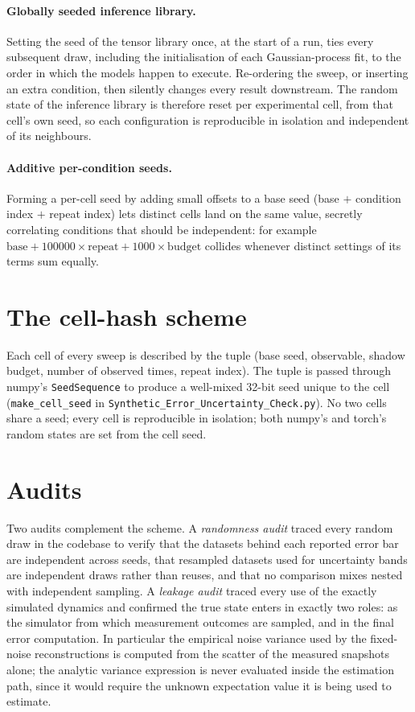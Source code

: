\documentclass[11pt]{article}
\begin{document}
\paragraph{Globally seeded inference library.} Setting the seed of the tensor library once, at the start
of a run, ties every subsequent draw, including the initialisation of each Gaussian-process fit, to the
order in which the models happen to execute. Re-ordering the sweep, or inserting an extra condition,
then silently changes every result downstream. The random state of the inference library is therefore
reset per experimental cell, from that cell's own seed, so each configuration is reproducible in
isolation and independent of its neighbours.

\paragraph{Additive per-condition seeds.} Forming a per-cell seed by adding small offsets to a base seed
(base $+$ condition index $+$ repeat index) lets distinct cells land on the same value, secretly
correlating conditions that should be independent: for example
$\mathrm{base}+100000\times\mathrm{repeat}+1000\times\mathrm{budget}$ collides whenever distinct settings
of its terms sum equally.

\section{The cell-hash scheme}
Each cell of every sweep is described by the tuple (base seed, observable, shadow budget, number of
observed times, repeat index). The tuple is passed through numpy's \texttt{SeedSequence} to produce a
well-mixed 32-bit seed unique to the cell (\texttt{make\_cell\_seed} in
\texttt{Synthetic\_Error\_Uncertainty\_Check.py}). No two cells share a seed; every cell is reproducible
in isolation; both numpy's and torch's random states are set from the cell seed.

\section{Audits}
Two audits complement the scheme. A \emph{randomness audit} traced every random draw in the codebase to
verify that the datasets behind each reported error bar are independent across seeds, that resampled
datasets used for uncertainty bands are independent draws rather than reuses, and that no comparison
mixes nested with independent sampling. A \emph{leakage audit} traced every use of the exactly simulated
dynamics and confirmed the true state enters in exactly two roles: as the simulator from which
measurement outcomes are sampled, and in the final error computation. In particular the empirical noise
variance used by the fixed-noise reconstructions is computed from the scatter of the measured snapshots
alone; the analytic variance expression is never evaluated inside the estimation path, since it would
require the unknown expectation value it is being used to estimate.
\end{document}

